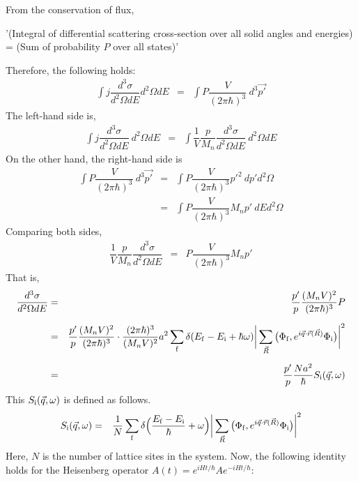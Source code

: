 \documentclass[a4j]{jsarticle}
\begin{document}
From the conservation of flux,

'(Integral of differential scattering cross-section over all solid angles and energies) = (Sum of probability $P$ over all states)'

Therefore, the following holds:
\begin{eqnarray}
	\int
	j
	\dfrac{ d^{3} \sigma }{ d^{2} \Omega d E }
	d^{2} \Omega d E
	&=&
	\int P \dfrac{V}{ ( 2 \pi \hbar)^{3} }
	\ d^{3} \vec{p'}
\end{eqnarray}
The left-hand side is,
\begin{eqnarray}
	\int
	j
	\dfrac{ d^{3} \sigma }{ d^{2} \Omega d E }
	\ d^{2} \Omega d E
	&=&
	\int
	\dfrac{1}{V}
	\dfrac{p}{M_{n}}
	\dfrac{ d^{3} \sigma }{ d^{2} \Omega d E }
	\ d^{2} \Omega d E
\end{eqnarray}
On the other hand, the right-hand side is
\begin{eqnarray}
	\int P \dfrac{V}{ ( 2 \pi \hbar)^{3} }
	\ d^{3} \vec{p'}
	&=&
	\int P \dfrac{V}{ ( 2 \pi \hbar)^{3} }
	p'^{2}
	\ d p' d^{2} \Omega
	\nonumber \\[3mm]　&=&
	\int P \dfrac{V}{ ( 2 \pi \hbar)^{3} }
	M_{n} p'
	\ d E d^{2} \Omega
\end{eqnarray}
Comparing both sides,
\begin{eqnarray}
	\dfrac{1}{V}
	\dfrac{p}{M_{n}}
	\dfrac{ d^{3} \sigma }{ d^{2} \Omega d E }
	&=&
	P \dfrac{V}{ ( 2 \pi \hbar)^{3} }
	M_{n} p'
\end{eqnarray}
That is,
\begin{eqnarray}
	\dfrac{ d^{3} \sigma }{ d^{2} \Omega d E }
	&=&
	\dfrac{p'}{p}
	\dfrac{(M_{n} V)^{2}}{ ( 2 \pi \hbar)^{3} }
	P
	\nonumber \\[2mm] &=&
	\dfrac{p'}{p}
	\dfrac{(M_{n} V)^{2}}{ ( 2 \pi \hbar)^{3} }
	\cdot
	\dfrac{ ( 2 \pi \hbar )^{3} }{ ( M_{n} V )^{2} }
	a^{2}
	\sum_{\rm f}
	\delta( E_{\rm f} - E_{\rm i} + \hbar \omega )
	\bigg|
	\sum_{\vec{R}}
	\big( \Phi_{\rm f} , e^{i \vec{q} \cdot \vec{r}(\vec{R})} \Phi_{\rm i} \big)
	\bigg|^{2}
	\nonumber \\[2mm] &=&
	\dfrac{p'}{p}
	\dfrac{ N a^{2} }{ \hbar }
	S_{\rm i}(\vec{q},\omega)
\end{eqnarray}
This $S_{\rm i}(\vec{q},\omega)$ is defined as follows.
\begin{eqnarray}
	S_{\rm i}(\vec{q},\omega)
	&=&
	\dfrac{1}{N}
	\sum_{\rm f}
	\delta \Big( \dfrac{E_{\rm f} - E_{\rm i}}{\hbar} + \omega \Big)
	\bigg|
	\sum_{\vec{R}}
	\big( \Phi_{\rm f} , e^{i \vec{q} \cdot \vec{r}(\vec{R})} \Phi_{\rm i} \big)
	\bigg|^{2}
\end{eqnarray}
Here, $N$ is the number of lattice sites in the system.
Now, the following identity holds for the Heisenberg operator $A(t)=e^{i H t/ \hbar} A e^{-i H t/ \hbar}$:
\end{document}
